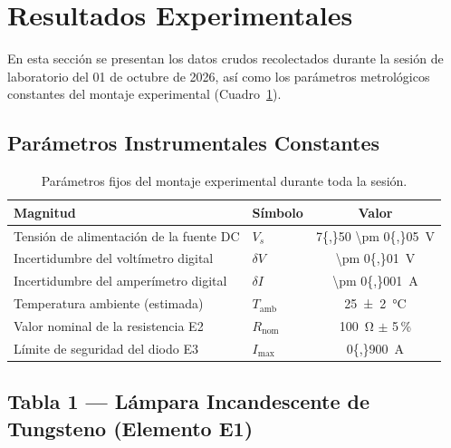 
\section{Resultados Experimentales}
\label{sec:resultados}

En esta sección se presentan los datos crudos recolectados durante la sesión de laboratorio del 01 de octubre de 2026, así como los parámetros metrológicos constantes del montaje experimental (Cuadro~\ref{tab:parametros_constantes}).

\subsection{Parámetros Instrumentales Constantes}

\begin{table}[H]
    \centering
    \caption{Parámetros fijos del montaje experimental durante toda la sesión.}
    \label{tab:parametros_constantes}
    \begin{tabular}{@{}llc@{}}
        \toprule
        \textbf{Magnitud} & \textbf{Símbolo} & \textbf{Valor} \\
        \midrule
        Tensión de alimentación de la fuente DC & $V_s$ & \qty{7{,}50 \pm 0{,}05}{\volt} \\
        Incertidumbre del voltímetro digital & $\delta V$ & \qty{\pm 0{,}01}{\volt} \\
        Incertidumbre del amperímetro digital & $\delta I$ & \qty{\pm 0{,}001}{\ampere} \\
        Temperatura ambiente (estimada) & $T_{\text{amb}}$ & \qty{25 \pm 2}{\celsius} \\
        Valor nominal de la resistencia E2 & $R_{\text{nom}}$ & \qty{100}{\ohm} $\pm$ 5\,\% \\
        Límite de seguridad del diodo E3 & $I_{\text{max}}$ & \qty{0{,}900}{\ampere} \\
        \bottomrule
    \end{tabular}
\end{table}

\subsection{Tabla 1 --- Lámpara Incandescente de Tungsteno (Elemento E1)}


